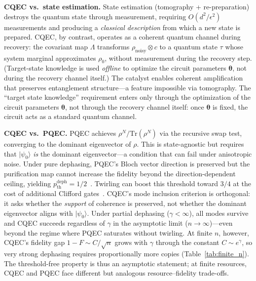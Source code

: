 \documentclass[a4paper,twocolumn]{quantumarticle}
\begin{document}
\textbf{CQEC vs.\ state estimation.}
State estimation (tomography + re-preparation) destroys the quantum state through measurement, requiring $O(d^2/\epsilon^2)$ measurements and producing a \emph{classical description} from which a new state is prepared.
CQEC, by contrast, operates as a coherent quantum channel during recovery: the covariant map $\Lambda$ transforms $\rho_\mathrm{noisy} \otimes c$ to a quantum state $\tau$ whose system marginal approximates $\rho_0$, without measurement during the recovery step.
(Target-state knowledge is used \emph{offline} to optimize the circuit parameters $\boldsymbol{\theta}$, not during the recovery channel itself.)
The catalyst enables coherent amplification that preserves entanglement structure---a feature impossible via tomography.
The ``target state knowledge'' requirement enters only through the optimization of the circuit parameters $\boldsymbol{\theta}$, not through the recovery channel itself: once $\boldsymbol{\theta}$ is fixed, the circuit acts as a standard quantum channel.

\textbf{CQEC vs.\ PQEC.}
PQEC achieves $\rho^N / \mathrm{Tr}(\rho^N)$ via the recursive swap test, converging to the dominant eigenvector of $\rho$.
This is state-agnostic but requires that $|\psi_0\rangle$ \emph{is} the dominant eigenvector---a condition that can fail under anisotropic noise.
Under pure dephasing, PQEC's Bloch vector direction is preserved but the purification map cannot increase the fidelity beyond the direction-dependent ceiling, yielding $p_\mathrm{th}^\mathrm{deph} = 1/2$~\cite{Raghoonanan2026}.
Twirling can boost this threshold toward $3/4$ at the cost of additional Clifford gates~\cite{Raghoonanan2026}.
CQEC's mode inclusion criterion is orthogonal: it asks whether the \emph{support} of coherence is preserved, not whether the dominant eigenvector aligns with $|\psi_0\rangle$.
Under partial dephasing ($\gamma < \infty$), all modes survive and CQEC succeeds regardless of $\gamma$ in the asymptotic limit ($n \to \infty$)---even beyond the regime where PQEC saturates without twirling.
At finite $n$, however, CQEC's fidelity gap $1 - F \sim C/\sqrt{n}$ grows with $\gamma$ through the constant $C \sim e^\gamma$, so very strong dephasing requires proportionally more copies (Table~\ref{tab:finite_n}).
The threshold-free property is thus an asymptotic statement; at finite resources, CQEC and PQEC face different but analogous resource--fidelity trade-offs.
\end{document}

